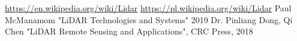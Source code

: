 \documentclass{thesis}
\begin{document}

\newpage
\tableofcontents
\newpage



\begin{thebibliography}{10}
 \url{https://en.wikipedia.org/wiki/Lidar}
 \url{https://pl.wikipedia.org/wiki/Lidar}
 Paul McManamom "LiDAR Technologies and Systems" 2019
 Dr. Pinliang Dong, Qi Chen "LiDAR Remote Sensing and Applications", CRC Press, 2018
\end{thebibliography}
\end{document}
